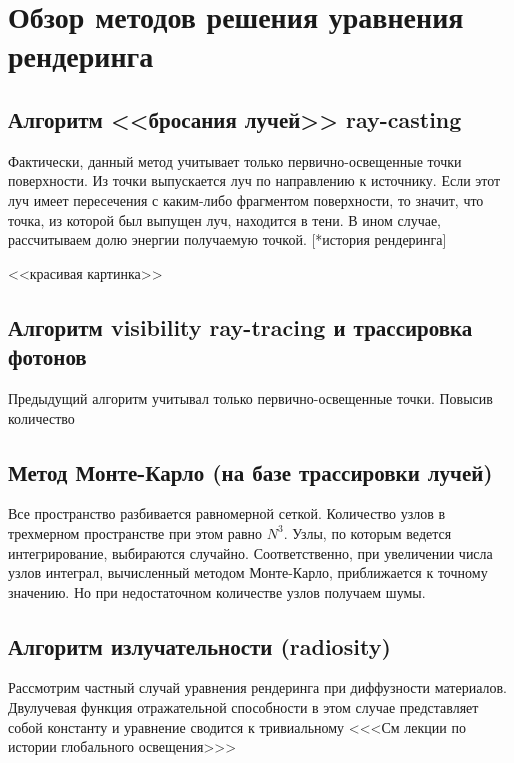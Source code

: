 \section*{Обзор методов решения уравнения рендеринга} 

\subsection*{Алгоритм <<бросания лучей>> ray-casting}

Фактически, данный метод учитывает только первично-освещенные точки поверхности. Из точки выпускается луч по направлению к источнику. Если этот луч имеет пересечения с каким-либо фрагментом поверхности, то значит, что точка, из которой был выпущен луч, находится в тени. В ином случае, рассчитываем долю энергии получаемую точкой. [*история рендеринга]

<<красивая картинка>>


\subsection*{Алгоритм visibility ray-tracing и трассировка фотонов}

Предыдущий алгоритм учитывал только первично-освещенные точки. Повысив количество 



\subsection*{Метод Монте-Карло (на базе трассировки лучей)}

Все пространство разбивается равномерной сеткой. Количество узлов в трехмерном пространстве при этом равно $N^3$. Узлы, по которым ведется интегрирование, выбираются случайно. Соответственно, при увеличении числа узлов интеграл, вычисленный методом Монте-Карло, приближается к точному значению. Но при недостаточном количестве узлов получаем шумы. 

\subsection*{Алгоритм излучательности (radiosity)}
Рассмотрим частный случай уравнения рендеринга при диффузности материалов. Двулучевая функция отражательной способности в этом случае представляет собой константу и уравнение сводится к тривиальному 
<<<См лекции по истории глобального освещения>>>


